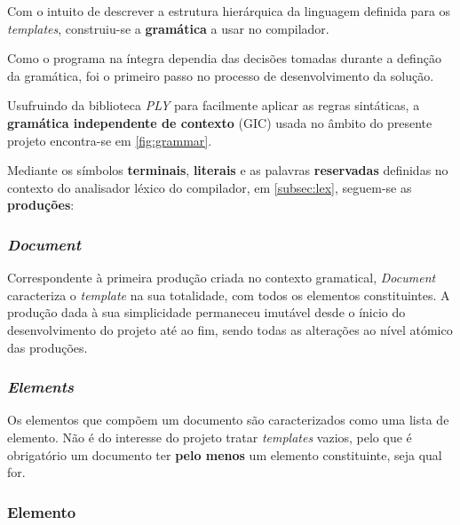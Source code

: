 \documentclass[../relatorio.tex]{subfiles}
\begin{document}
Com o intuito de descrever a estrutura hierárquica da linguagem
definida para os \textit{templates}, construiu-se a \textbf{gramática} 
a usar no compilador. 

Como o programa na íntegra dependia das decisões tomadas durante
a definção da gramática, foi o primeiro passo no processo de desenvolvimento
da solução. 

Usufruindo da biblioteca \textit{PLY} para facilmente aplicar as 
regras sintáticas, a \textbf{gramática independente de contexto} (GIC) usada 
no âmbito do presente projeto encontra-se em \ref{fig:grammar}.

Mediante os símbolos \textbf{terminais}, \textbf{literais} e as palavras 
\textbf{reservadas} definidas no contexto do analisador léxico do 
compilador, em \ref{subsec:lex}, seguem-se as \textbf{produções}:

\subsubsection{\textit{Document}}
Correspondente à primeira produção criada no contexto gramatical,
\textit{Document} caracteriza o \textit{template} na sua totalidade,
com todos os elementos constituintes.
A produção dada à sua simplicidade permaneceu imutável desde o ínicio
do desenvolvimento do projeto até ao fim, sendo todas as alterações 
ao nível atómico das produções.

\subsubsection{\textit{Elements}}
Os elementos que compõem um documento são caracterizados como uma lista 
de elemento. 
Não é do interesse do projeto tratar \textit{templates} vazios, pelo que 
é obrigatório um documento ter \textbf{pelo menos} um 
elemento constituinte, seja qual for. 

\subsubsection{Elemento}
\end{document}

